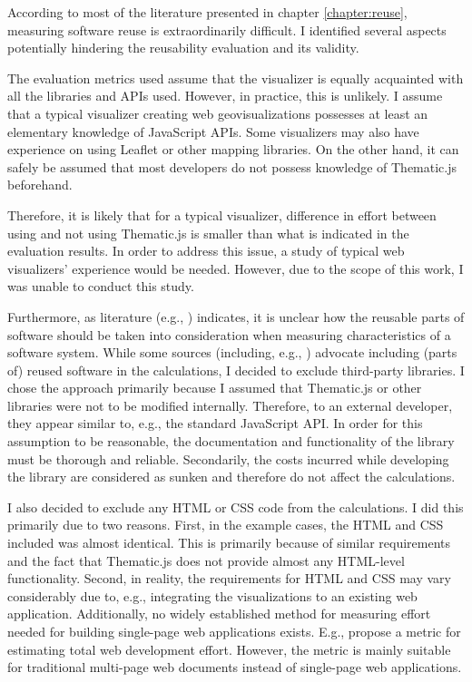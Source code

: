 According to most of the literature presented in chapter \ref{chapter:reuse}, measuring software reuse is extraordinarily difficult. I identified several aspects potentially hindering the reusability evaluation and its validity.

The evaluation metrics used assume that the visualizer is equally acquainted with all the libraries and APIs used. However, in practice, this is unlikely. I assume that a typical visualizer creating web geovisualizations possesses at least an elementary knowledge of JavaScript APIs. Some visualizers may also have experience on using Leaflet or other mapping libraries. On the other hand, it can safely be assumed that most developers do not possess knowledge of Thematic.js beforehand. 

Therefore, it is likely that for a typical visualizer, difference in effort between using and not using Thematic.js is smaller than what is indicated in the evaluation results. In order to address this issue, a study of typical web visualizers' experience would be needed. However, due to the scope of this work, I was unable to conduct this study.

Furthermore, as literature (e.g., \citealt{frakes_success_1994,mohagheghi_quality_2007}) indicates, it is unclear how the reusable parts of software should be taken into consideration when measuring characteristics of a software system. While some sources (including, e.g., \citealt{frakes_software_1996,selby_enabling_2005}) advocate including (parts of) reused software in the calculations, I decided to exclude third-party libraries. I chose the approach primarily because I assumed that Thematic.js or other libraries were not to be modified internally. Therefore, to an external developer, they appear similar to, e.g., the standard JavaScript API. In order for this assumption to be reasonable, the documentation and functionality of the library must be thorough and reliable. Secondarily, the costs incurred while developing the library are considered as sunken and therefore do not affect the calculations.

I also decided to exclude any HTML or CSS code from the calculations. I did this primarily due to two reasons. First, in the example cases, the HTML and CSS included was almost identical. This is primarily because of similar requirements and the fact that Thematic.js does not provide almost any HTML-level functionality. Second, in reality, the requirements for HTML and CSS may vary considerably due to, e.g., integrating the visualizations to an existing web application. Additionally, no widely established method for measuring effort needed for building single-page web applications exists. E.g., \citet{mendes_web_2001} propose a metric for estimating total web development effort. However, the metric is mainly suitable for traditional multi-page web documents instead of single-page web applications.

